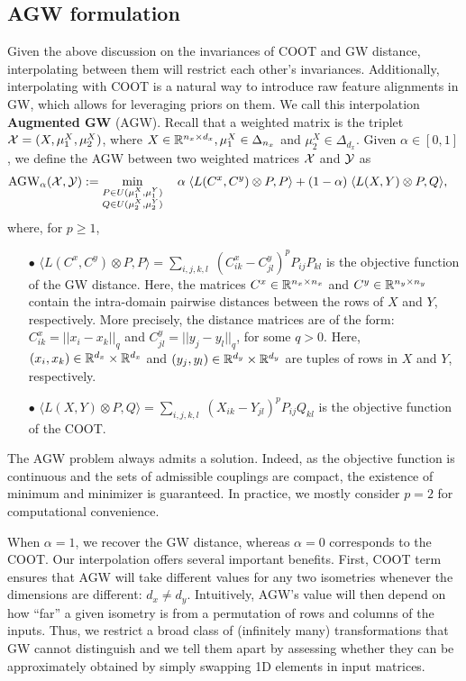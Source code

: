 \subsection{AGW formulation} \label{subsec:agw_formulation}
Given the above discussion on the invariances of COOT and GW distance,
interpolating between them will restrict each other's invariances. Additionally,
interpolating with COOT is a natural way to introduce raw feature alignments in GW,
which allows for leveraging priors on them. We call this interpolation \textbf{Augmented GW} (AGW).
Recall that a weighted matrix is the triplet $\mathcal X = (X, \mu_1^X, \mu_2^X)$, where
$X \in \mathbb R^{n_x \times d_x}, \mu_1^X \in \Delta_{n_x}$ and $\mu_2^X \in \Delta_{d_x}$.
Given $\alpha \in [0,1]$, we define the AGW between two weighted matrices $\mathcal X$ and $\mathcal Y$ as
\begin{align}
\label{eq:scootr}
\text{AGW}_{\alpha}(\mathcal X, \mathcal Y) &:=
\min_{\substack{P \in U(\mu_1^X, \mu_1^Y) \\ Q \in U(\mu_2^X,\mu_2^Y)}} \quad
\alpha \; \langle L(C^x,C^y) \otimes P, P \rangle + (1-\alpha) \; \langle L(X,Y) \otimes P, Q \rangle,
\end{align}
where, for $p \geq 1$,
\begin{itemize}
    \item[$\bullet$] $\langle L(C^x,C^y) \otimes P, P \rangle
    = \sum_{i,j,k,l} \; (C^x_{ik} - C^y_{jl})^p P_{ij} P_{kl}$ is the objective function of
    the GW distance. Here, the matrices $C^x \in \mathbb R^{n_x \times n_x}$ and
    $C^y \in \mathbb R^{n_y \times n_y}$
    contain the intra-domain pairwise distances between the rows of $X$ and $Y$, respectively.
    More precisely, the distance matrices are of the form:
    $C^x_{ik} = ||x_i - x_k||_q$ and $C^y_{jl} = ||y_j - y_l||_q$, for some $q > 0$. Here,
    $(x_i, x_k) \in \mathbb R^{d_x} \times \mathbb R^{d_x}$ and $(y_j, y_l) \in \mathbb R^{d_y} \times \mathbb R^{d_y}$
    are tuples of rows in $X$ and $Y$, respectively.

    \item[$\bullet$] $\langle L(X,Y) \otimes P, Q \rangle =
    \sum_{i,j,k,l} \; (X_{ik} - Y_{jl})^p P_{ij} Q_{kl}$ is the objective function of the COOT.
\end{itemize}
The AGW problem always admits a solution. Indeed, as the objective function is continuous
and the sets of admissible couplings are compact, the existence of minimum and minimizer
is guaranteed. In practice, we mostly consider $p=2$ for computational convenience.

When $\alpha = 1$, we recover the GW distance, whereas $\alpha = 0$ corresponds to the
COOT. Our interpolation offers several important benefits. First, COOT term ensures that AGW
will take different values for any two isometries whenever the dimensions are different: $d_x \neq d_y$. Intuitively,
AGW's value will then depend on how ``far'' a given isometry is from a permutation of rows
and columns of the inputs. Thus, we restrict a broad class of (infinitely many) transformations
that GW cannot distinguish and we tell them apart by assessing whether they
can be approximately obtained by simply swapping 1D elements in input matrices.

